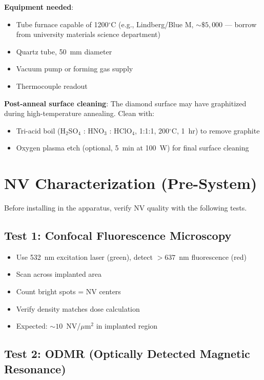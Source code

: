 \documentclass[11pt,a4paper,openany]{book}
\begin{document}
\noindent
\textbf{Equipment needed}:
\begin{itemize}[nosep]
  \item Tube furnace capable of 1200$^\circ$C (e.g., Lindberg/Blue M, ${\sim}\$5{,}000$ --- borrow from university materials science department)
  \item Quartz tube, 50~mm diameter
  \item Vacuum pump or forming gas supply
  \item Thermocouple readout
\end{itemize}

\noindent
\textbf{Post-anneal surface cleaning}: The diamond surface may have graphitized during high-temperature annealing. Clean with:
\begin{itemize}[nosep]
  \item Tri-acid boil (H$_2$SO$_4$ : HNO$_3$ : HClO$_4$, 1:1:1, 200$^\circ$C, 1~hr) to remove graphite
  \item Oxygen plasma etch (optional, 5~min at 100~W) for final surface cleaning
\end{itemize}

\section{NV Characterization (Pre-System)}

Before installing in the apparatus, verify NV quality with the following tests.

\subsection{Test 1: Confocal Fluorescence Microscopy}

\begin{itemize}[nosep]
  \item Use 532~nm excitation laser (green), detect $> 637$~nm fluorescence (red)
  \item Scan across implanted area
  \item Count bright spots = NV centers
  \item Verify density matches dose calculation
  \item Expected: ${\sim}10$~NV/$\mu$m$^2$ in implanted region
\end{itemize}

\subsection{Test 2: ODMR (Optically Detected Magnetic Resonance)}
\end{document}

